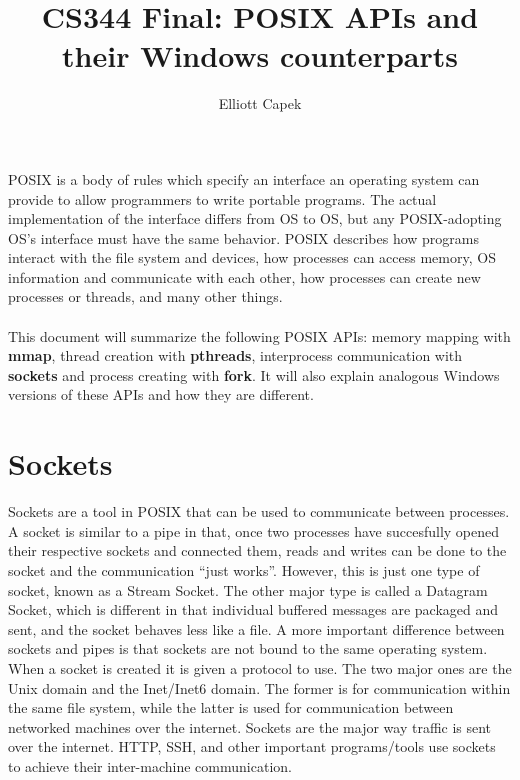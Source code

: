 \documentclass[11pt]{article}
\begin{document}
\title{CS344 Final: POSIX APIs and their Windows counterparts}
\author{Elliott Capek}
\maketitle

POSIX is a body of rules which specify an interface an operating system can provide to allow programmers to write portable programs. The actual implementation of the interface differs from OS to OS, but any POSIX-adopting OS's interface must have the same behavior. POSIX describes how programs interact with the file system and devices, how processes can access memory, OS information and communicate with each other, how processes can create new processes or threads, and many other things. \\ \\
This document will summarize the following POSIX APIs: memory mapping with \textbf{mmap}, thread creation with \textbf{pthreads}, interprocess communication with \textbf{sockets} and process creating with \textbf{fork}. It will also explain analogous Windows versions of these APIs and how they are different.\\

\section{Sockets}
Sockets are a tool in POSIX that can be used to communicate between processes. A socket is similar to a pipe in that, once two processes have succesfully opened their respective sockets and connected them, reads and writes can be done to the socket and the communication ``just works''. However, this is just one type of socket, known as a Stream Socket. The other major type is called a Datagram Socket, which is different in that individual buffered messages are packaged and sent, and the socket behaves less like a file. A more important difference between sockets and pipes is that sockets are not bound to the same operating system. When a socket is created it is given a protocol to use. The two major ones are the Unix domain and the Inet/Inet6 domain. The former is for communication within the same file system, while the latter is used for communication between networked machines over the internet. Sockets are the major way traffic is sent over the internet. HTTP, SSH, and other important programs/tools use sockets to achieve their inter-machine communication.
\end{document}
